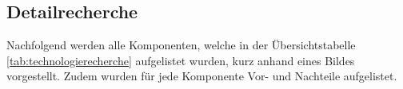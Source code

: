 \subsection*{Detailrecherche}
Nachfolgend werden alle Komponenten, welche in der Übersichtstabelle \ref{tab:technologierecherche} aufgelistet wurden, kurz anhand eines Bildes vorgestellt. Zudem wurden für jede Komponente Vor- und Nachteile aufgelistet.








